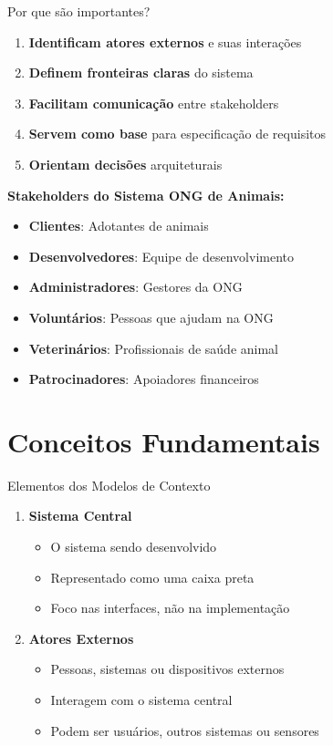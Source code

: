 \documentclass[aspectratio=169]{beamer}
\begin{document}
\begin{frame}{Por que são importantes?}
\begin{enumerate}
\item \textbf{Identificam atores externos} e suas interações
\item \textbf{Definem fronteiras claras} do sistema
\item \textbf{Facilitam comunicação} entre stakeholders
\item \textbf{Servem como base} para especificação de requisitos
\item \textbf{Orientam decisões} arquiteturais
\end{enumerate}

\vspace{0.5cm}
\textbf{Stakeholders do Sistema ONG de Animais:}
\begin{itemize}
\item \textbf{Clientes}: Adotantes de animais
\item \textbf{Desenvolvedores}: Equipe de desenvolvimento
\item \textbf{Administradores}: Gestores da ONG
\item \textbf{Voluntários}: Pessoas que ajudam na ONG
\item \textbf{Veterinários}: Profissionais de saúde animal
\item \textbf{Patrocinadores}: Apoiadores financeiros
\end{itemize}
\end{frame}

\section{Conceitos Fundamentais}

\begin{frame}{Elementos dos Modelos de Contexto}
\begin{enumerate}
\item \textbf{Sistema Central}
\begin{itemize}
\item O sistema sendo desenvolvido
\item Representado como uma caixa preta
\item Foco nas interfaces, não na implementação
\end{itemize}

\item \textbf{Atores Externos}
\begin{itemize}
\item Pessoas, sistemas ou dispositivos externos
\item Interagem com o sistema central
\item Podem ser usuários, outros sistemas ou sensores
\end{itemize}
\end{enumerate}
\end{frame}
\end{document}
